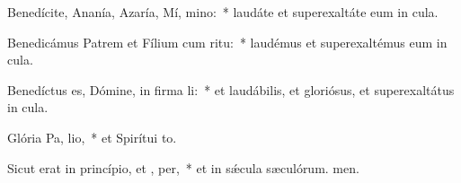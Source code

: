 \item Benedícite, Ananía, Azaría, Mí, mino:~* laudáte et superexaltáte eum in cula.
\item Benedicámus Patrem et Fílium cum  ritu:~* laudémus et superexaltémus eum in cula.
\item Benedíctus es, Dómine, in firma li:~* et laudábilis, et gloriósus, et superexaltátus in cula.
\item Glória Pa,  lio,~* et Spirítui to.
\item Sicut erat in princípio, et ,  per,~* et in sǽcula sæculórum. men.

